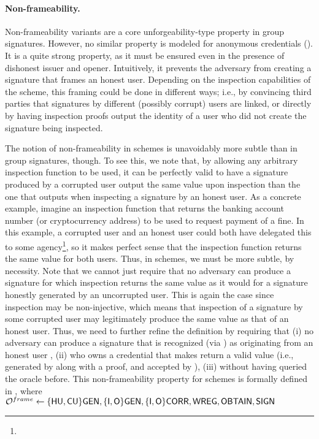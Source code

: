 \paragraph{Non-frameability.} %
Non-frameability variants are a core unforgeability-type property in group
signatures. However, no
similar property is modeled for anonymous credentials (). It is a quite strong
property, as it must be ensured even in the presence of dishonest issuer and
opener. Intuitively, it prevents the adversary from creating a signature that
frames an honest user. Depending on the inspection capabilities of the scheme,
this framing could be done in different ways; i.e., by convincing third parties
that signatures by different (possibly corrupt) users are linked, or directly
by having inspection proofs output the identity of a user who did not create the
signature being inspected.

The notion of non-frameability in \UAS schemes is unavoidably more subtle than
in group signatures, though. To see this, we note that, by allowing any
arbitrary inspection function \finsp to be used, it can be perfectly valid to
have a signature produced by a corrupted user output the same \y value upon
inspection than the one that \finsp outputs when inspecting a signature by an
honest user. As a concrete example, imagine an inspection function that returns
the banking account number (or cryptocurrency address) to be used to request
payment of a fine. In this example, a corrupted user and an honest user could
both have delegated this to some agency\footnote{}, so it makes perfect sense
that the inspection function returns the same value for both users.
%
Thus, in \UAS schemes, we must be more subtle, by necessity. Note that we cannot
just require that no adversary can produce a signature for which inspection
returns the same value as it would for a signature honestly generated by an
uncorrupted user. This is again the case since inspection may be non-injective,
which means that inspection of a signature by some corrupted user may
legitimately produce the same value as that of an honest user. Thus, we need
to further refine the definition by requiring that (i) no adversary can produce
a signature that is recognized (via \Identify) as originating from an honest
user \uid, (ii) who owns a credential that makes \finsp return a valid \y value
(i.e., generated by \Inspect along with a proof, and accepted by \Judge), (iii)
without having queried the \SIGN oracle before. This non-frameability property
for \UAS schemes is formally defined in , where
$\mathcal{O}^{frame} \gets \lbrace\mathsf{HU},\mathsf{CU}\rbrace\mathsf{GEN},
\lbrace\mathsf{I},\mathsf{O}\rbrace\mathsf{GEN},\lbrace\mathsf{I},\mathsf{O}\rbrace\mathsf{CORR},\mathsf{WREG},\mathsf{OBTAIN},\mathsf{SIGN}$

